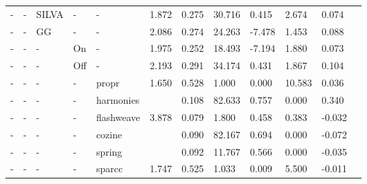 \begin{landscape}
\begin{table}[H]
\begin{tabular}{|l|p{1cm}|p{1cm}|p{1cm}|p{2cm}|p{1.5cm}|p{1.5cm}|p{1.5cm}|p{1.5cm}|p{1.5cm}|p{1.5cm}|p{1.5cm}|}
  -  & -             & SILVA             & -           & -          & 1.872                        & 0.275              & 30.716                      & 0.415      & 2.674             & 0.074                            \\
  -  & -             & GG                & -           & -          & 2.086                        & 0.274              & 24.263                      & -7.478     & 1.453             & 0.088                            \\
  -  & -             & -                 & On          & -          & 1.975                        & 0.252              & 18.493                      & -7.194     & 1.880             & 0.073                            \\
  -  & -             & -                 & Off         & -          & 2.193                        & 0.291              & 34.174                      & 0.431      & 1.867             & 0.104                            \\
  -  & -             & -                 & -           & propr      & 1.650                        & 0.528              & 1.000                       & 0.000      & 10.583            & 0.036                            \\
  -  & -             & -                 & -           & harmonies  &                              & 0.108              & 82.633                      & 0.757      & 0.000             & 0.340                            \\
  -  & -             & -                 & -           & flashweave & 3.878                        & 0.079              & 1.800                       & 0.458      & 0.383             & -0.032                           \\
  -  & -             & -                 & -           & cozine     &                              & 0.090              & 82.167                      & 0.694      & 0.000             & -0.072                           \\
  -  & -             & -                 & -           & spring     &                              & 0.092              & 11.767                      & 0.566      & 0.000             & -0.035                           \\
  -  & -             & -                 & -           & sparcc     & 1.747                        & 0.525              & 1.033                       & 0.009      & 5.500             & -0.011                           \\

\end{tabular}
\end{table}
\end{landscape}
